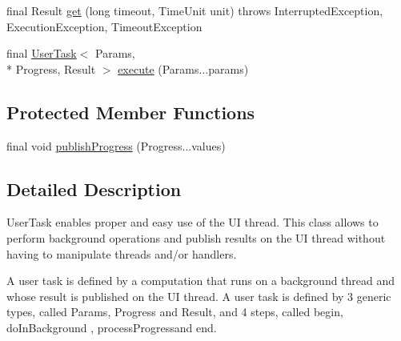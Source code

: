 \begin{DoxyCompactItemize}
final Result \hyperlink{classcom_1_1cellbots_1_1communication_1_1_user_task_3_01_params_00_01_progress_00_01_result_01_4_aec21bec2122788a4f70666151ea380ef}{get} (long timeout, Time\-Unit unit)  throws Interrupted\-Exception, Execution\-Exception, Timeout\-Exception 
\item 
final \hyperlink{classcom_1_1cellbots_1_1communication_1_1_user_task_3_01_params_00_01_progress_00_01_result_01_4_ad6e99e8d228daef6a7ece12157939b0d}{User\-Task}$<$ Params, \\*
Progress, Result $>$ \hyperlink{classcom_1_1cellbots_1_1communication_1_1_user_task_3_01_params_00_01_progress_00_01_result_01_4_a2e44ceca4eef87a256b191047e362862}{execute} (Params...\-params)
\end{DoxyCompactItemize}
\subsection*{Protected Member Functions}
\begin{DoxyCompactItemize}
\item 
final void \hyperlink{classcom_1_1cellbots_1_1communication_1_1_user_task_3_01_params_00_01_progress_00_01_result_01_4_aac6548bd9089aa6c6c77056074310104}{publish\-Progress} (Progress...\-values)
\end{DoxyCompactItemize}


\subsection{Detailed Description}
User\-Task enables proper and easy use of the U\-I thread. This class allows to perform background operations and publish results on the U\-I thread without having to manipulate threads and/or handlers. 

A user task is defined by a computation that runs on a background thread and whose result is published on the U\-I thread. A user task is defined by 3 generic types, called {\ttfamily Params}, {\ttfamily Progress} and {\ttfamily  Result}, and 4 steps, called {\ttfamily begin}, {\ttfamily do\-In\-Background }, {\ttfamily process\-Progress{\ttfamily and {\ttfamily end}. }}

{}

{\ttfamily {\ttfamily  }}

{}

